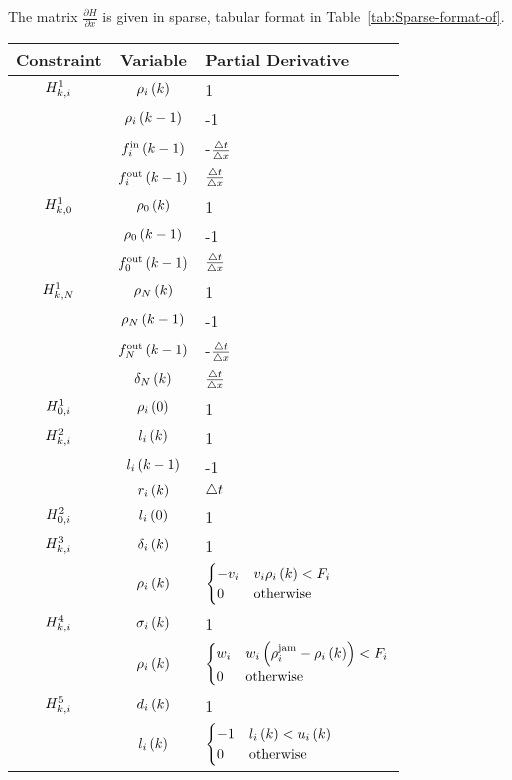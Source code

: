 The matrix $\frac{\partial H}{\partial x}$ is given in sparse, tabular
format in Table~\ref{tab:Sparse-format-of}.
\begin{longtable}{|c|c|l|}
\hline 
Constraint & Variable & Partial Derivative\tabularnewline
\hline 
\hline 
$H^{1}_{k, i}$ & $\rho_{i}\left(k\right)$ & 1\tabularnewline
\hline 
& $\rho_{i}\left(k-1\right)$ & -1\tabularnewline
\hline 
& $f_{i}^{\text{in}}\left(k-1\right)$ & -$\frac{\triangle t}{\triangle x}$\tabularnewline
\hline 
&$f_{i}^{\text{out}}\left(k-1\right)$ & $\frac{\triangle t}{\triangle x}$\tabularnewline
\hline 
\hline 
$H^{1}_{k, 0}$ & $\rho_{0}\left(k\right)$ & 1\tabularnewline
\hline 
& $\rho_{0}\left(k-1\right)$ & -1\tabularnewline
\hline 
& $f_{0}^{\text{out}}\left(k-1\right)$ & $\frac{\triangle t}{\triangle x}$\tabularnewline
\hline 
\hline 
$H^{1}_{k, N}$ & $\rho_{N}\left(k\right)$ & 1\tabularnewline
\hline 
& $\rho_{N}\left(k-1\right)$ & -1\tabularnewline
\hline 
& $f_{N}^{\text{out}}\left(k-1\right)$ & -$\frac{\triangle t}{\triangle x}$\tabularnewline
\hline 
& $\delta_{N}\left(k\right)$ & $\frac{\triangle t}{\triangle x}$\tabularnewline
\hline
\hline 
$H^{1}_{0, i}$ & $\rho_{i}\left(0\right)$ & 1\tabularnewline
\hline 
\hline 
$H^{2}_{k, i}$ & $l_{i}\left(k\right)$ & 1\tabularnewline
\hline 
& $l_{i}\left(k-1\right)$ & -1\tabularnewline
\hline 
& $r_{i}\left(k\right)$ & $\triangle t$ \tabularnewline
\hline 
\hline 
$H^{2}_{0, i}$ & $l_{i}\left(0\right)$ & 1\tabularnewline
\hline 
\hline 
$H^{3}_{k, i}$ & $\delta_{i}\left(k\right)$ & 1\tabularnewline
\hline 
& $\rho_{i}\left(k\right)$& $\begin{cases}
-v_{i} & v_{i}\rho_{i}\left(k\right)<F_{i}\\
0 & \text{otherwise}
\end{cases}$\tabularnewline
\hline 
\hline 
$H^{4}_{k, i}$ & $\sigma_{i}\left(k\right)$ & 1\tabularnewline
\hline 
& $\rho_{i}\left(k\right)$ & $\begin{cases}
w_{i} & w_{i}\left(\rho^{\text{jam}}_{i}-\rho_{i}\left(k\right)\right)<F_{i}\\
0 & \text{otherwise}
\end{cases}$\tabularnewline
\hline 
\hline 
$H^{5}_{k, i}$ & $d_{i}\left(k\right)$ & 1\tabularnewline
\hline 
& $l_{i}\left(k\right)$ & $\begin{cases}
-1 & l_{i}\left(k\right)<u_{i}\left(k\right)\\
0 & \text{otherwise}
\end{cases}$\tabularnewline

\end{longtable}
